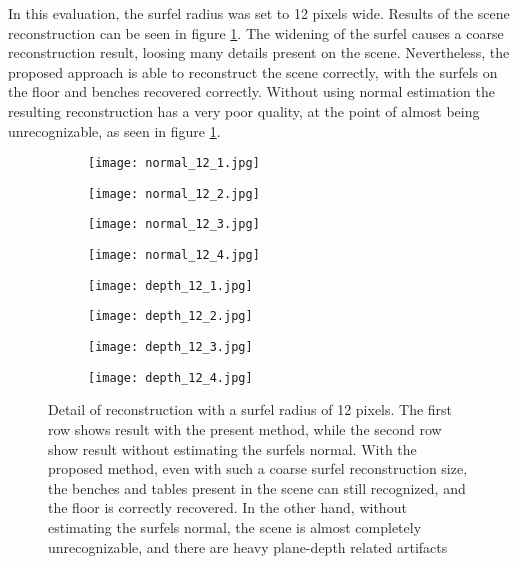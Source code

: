 \documentclass[1p]{elsarticle}
\begin{document}
In this evaluation, the surfel radius was set to 12 pixels wide. Results of the scene reconstruction can be seen in figure \ref{fig:surfel_12}. The widening of the surfel causes a coarse reconstruction result, loosing many details present on the scene. Nevertheless, the proposed approach is able to reconstruct the scene correctly, with the surfels on the floor and benches recovered correctly. Without using normal estimation the resulting reconstruction has a very poor quality, at the point of almost being unrecognizable, as seen in figure \ref{fig:surfel_12}.

\begin{figure}[h]
     \centering
     \begin{subfigure}[b]{0.24\textwidth}
         \centering
         \texttt{[image: normal\_12\_1.jpg]}
     \end{subfigure}
     \begin{subfigure}[b]{0.24\textwidth}
         \centering
         \texttt{[image: normal\_12\_2.jpg]}
     \end{subfigure}
     \begin{subfigure}[b]{0.24\textwidth}
         \centering
         \texttt{[image: normal\_12\_3.jpg]}
     \end{subfigure}
     \begin{subfigure}[b]{0.24\textwidth}
         \centering
         \texttt{[image: normal\_12\_4.jpg]}
     \end{subfigure}
     \begin{subfigure}[b]{0.24\textwidth}
         \centering
         \texttt{[image: depth\_12\_1.jpg]}
     \end{subfigure}
     \begin{subfigure}[b]{0.24\textwidth}
         \centering
         \texttt{[image: depth\_12\_2.jpg]}
     \end{subfigure}
     \begin{subfigure}[b]{0.24\textwidth}
         \centering
         \texttt{[image: depth\_12\_3.jpg]}
     \end{subfigure}
     \begin{subfigure}[b]{0.24\textwidth}
         \centering
         \texttt{[image: depth\_12\_4.jpg]}
     \end{subfigure}
     \caption{Detail of reconstruction with a surfel radius of 12 pixels. The first row shows result with the present method, while the second row show result without estimating the surfels normal. With the proposed method, even with such a coarse surfel reconstruction size, the benches and tables present in the scene can still recognized, and the floor is correctly recovered. In the other hand, without estimating the surfels normal, the scene is almost completely unrecognizable, and there are heavy plane-depth related artifacts}
             \label{fig:surfel_12}
\end{figure}
\end{document}
